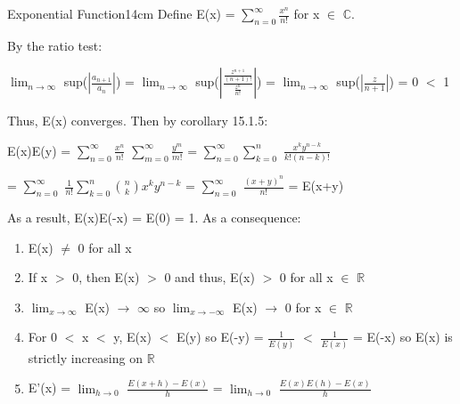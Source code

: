     \begin{definition}{Exponential Function}{14cm}
        Define E(x) = $\sum_{n=0}^{\infty} \frac{x^n}{n!}$
        for x $\in$ $\mathbb{C}$.
        
        By the ratio test:

        \hspace{0.5cm}
        $\lim_{n \rightarrow \infty}$ sup($|\frac{a_{n+1}}{a_n}|$)
        = $\lim_{n \rightarrow \infty}$ sup($|\frac{\frac{z^{n+1}}{(n+1)!}}
                                                    {\frac{z^n}{n!}}|$)
        = $\lim_{n \rightarrow \infty}$ sup($|\frac{z}{n+1}|$)
        = 0 $<$ 1

        Thus, E(x) converges.
        Then by {\color{orange} corollary 15.1.5}:

        \hspace{0.5cm}
        E(x)E(y)
        = $\sum_{n=0}^{\infty} \frac{x^n}{n!}$ $\sum_{m=0}^{\infty} \frac{y^m}{m!}$
        = $\sum_{n=0}^{\infty} \sum_{k=0}^n$ $\frac{x^k y^{n-k}}{k!(n-k)!}$

        \hspace{2.7cm}
        = $\sum_{n=0}^{\infty}$ $\frac{1}{n!} \sum_{k=0}^n \binom{n}{k} x^k y^{n-k}$
        = $\sum_{n=0}^{\infty}$ $\frac{(x+y)^n}{n!}$
        = E(x+y)

        \vspace{0.1cm}

        As a result, E(x)E(-x) = E(0) = 1.
        As a consequence:

        \begin{enumerate}[label=(\alph*), leftmargin=1.5cm, itemsep=0.1cm]
            \item E(x) $\not =$ 0 for all x
            
            \item If x $>$ 0, then E(x) $>$ 0 and thus,
                E(x) $>$ 0 for all x $\in$ $\mathbb{R}$
            
            \item $\lim_{x \rightarrow \infty}$ E(x) $\rightarrow$ $\infty$
                so $\lim_{x \rightarrow -\infty}$ E(x) $\rightarrow$ 0
                for x $\in$ $\mathbb{R}$

            \item For 0 $<$ x $<$ y, E(x) $<$ E(y) so
                E(-y) = $\frac{1}{E(y)}$ $<$ $\frac{1}{E(x)}$ = E(-x)
                so E(x) is strictly increasing on $\mathbb{R}$

            \item E'(x) = $\lim_{h \rightarrow 0}$ $\frac{E(x+h) - E(x)}{h}$
                = $\lim_{h \rightarrow 0}$ $\frac{E(x)E(h) - E(x)}{h}$


\end{enumerate}
\end{definition}
